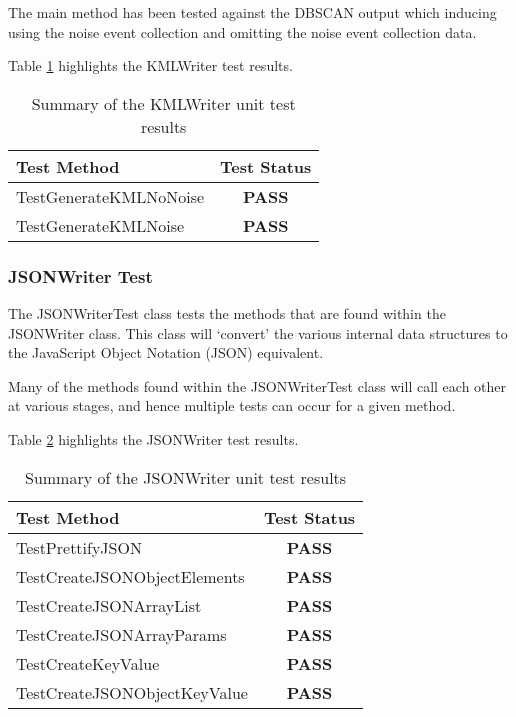The main method has been tested against the DBSCAN output which inducing using 
the noise event collection and omitting the noise event collection data.

Table \ref{tab:kml_writer_test} highlights the KMLWriter test results.

\begin{table}[h]
  \centering
  \begin{tabular}{|l|c|}
    \hline
    {\bfseries Test Method} & {\bfseries Test Status} \\ 
    \hline
    TestGenerateKMLNoNoise  & {\bfseries \color{OliveGreen} PASS}   \\ 
    TestGenerateKMLNoise    & {\bfseries \color{OliveGreen} PASS}   \\
    \hline
  \end{tabular}
  \caption[Summary of the KMLWriter unit test results]
          {Summary of the KMLWriter unit test results}
  \label{tab:kml_writer_test}
\end{table}


\subsubsection{JSONWriter Test}

The {\ttfamily JSONWriterTest} class tests the methods that are found within 
the JSONWriter class. This class will `convert' the various internal data 
structures to the JavaScript Object Notation (JSON) equivalent.

Many of the methods found within the {\ttfamily JSONWriterTest} class will call
each other at various stages, and hence multiple tests can occur for a given 
method.

Table \ref{tab:json_writer_test} highlights the JSONWriter test results.

\begin{table}[h]
  \centering
  \begin{tabular}{|l|c|}
    \hline
    {\bfseries Test Method}      & {\bfseries Test Status} \\ 
    \hline
    TestPrettifyJSON             & {\bfseries \color{OliveGreen} PASS} \\ 
    TestCreateJSONObjectElements & {\bfseries \color{OliveGreen} PASS} \\ 
    TestCreateJSONArrayList      & {\bfseries \color{OliveGreen} PASS} \\ 
    TestCreateJSONArrayParams    & {\bfseries \color{OliveGreen} PASS} \\ 
    TestCreateKeyValue           & {\bfseries \color{OliveGreen} PASS} \\ 
    TestCreateJSONObjectKeyValue & {\bfseries \color{OliveGreen} PASS} \\
    \hline
  \end{tabular}
  \caption[Summary of the JSONWriter unit test results]
          {Summary of the JSONWriter unit test results}
  \label{tab:json_writer_test}
\end{table}


